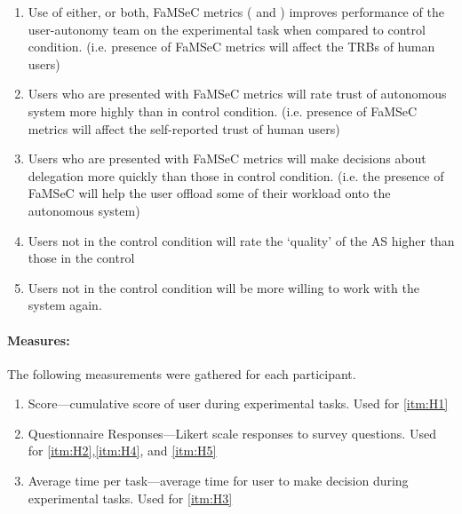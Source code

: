     \begin{enumerate}[label=\textbf{H\arabic*}]
        \item Use of either, or both, FaMSeC metrics (\xQ{} and \xO{}) improves performance of the user-autonomy team on the experimental task when compared to control condition. (i.e. presence of FaMSeC metrics will affect the TRBs of human users) \label{itm:H1}
        \item Users who are presented with FaMSeC metrics will rate trust of autonomous system more highly than in control condition. (i.e. presence of FaMSeC metrics will affect the self-reported trust of human users) \label{itm:H2}
        \item Users who are presented with FaMSeC metrics will make decisions about delegation more quickly than those in control condition. (i.e. the presence of FaMSeC will help the user offload some of their workload onto the autonomous system) \label{itm:H3}
        \item Users not in the control condition will rate the ‘quality’ of the AS higher than those in the control \label{itm:H4}
        \item Users not in the control condition will be more willing to work with the system again. \label{itm:H5}
    \end{enumerate}

    \paragraph{Measures:}
    The following measurements were gathered for each participant.
    \begin{enumerate}[label=\textbf{M\arabic*}]
        \item Score---cumulative score of user during experimental tasks. Used for \ref{itm:H1}
        \item Questionnaire Responses---Likert scale responses to survey questions. Used for \ref{itm:H2},\ref{itm:H4}, and \ref{itm:H5}
        \item Average time per task---average time for user to make decision during experimental tasks. Used for \ref{itm:H3}
    \end{enumerate}

